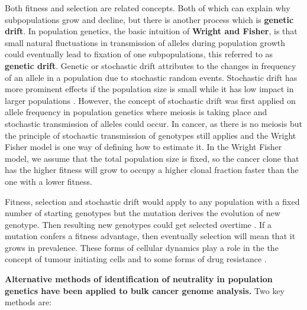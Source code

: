 Both fitness and selection are related concepts. Both of which can explain why subpopulations grow and decline, but there is another process which is \textbf{genetic drift}. In population genetics, the basic intuition of \textbf{Wright and Fisher}, is that small natural fluctuations in transmission of alleles during population growth could eventually lead to fixation of one subpopulations, this referred to as \textbf{genetic  drift}. Genetic or stochastic drift attributes to the changes in frequency of an allele in a population due to stochastic random events. Stochastic drift has more prominent effects if the population size is small while it has low impact in larger populations \cite{lynch2007origins}. However, the concept of stochastic drift was first applied on allele frequency in population genetics where meiosis is taking place and stochastic transmission of alleles could occur. In cancer, as there is no meiosis but the principle of stochastic transmission of genotypes still applies and the Wright Fisher model is one way of defining how to estimate it. In the Wright Fisher model, we assume that the total population size is fixed, so the cancer clone that has the higher fitness will grow to occupy a higher clonal fraction faster than the one with a lower fitness.


Fitness, selection and stochastic drift would apply to any population with a fixed number of starting genotypes but the mutation derives the evolution of new genotype. Then resulting new genotypes could get selected overtime \cite{jain2007deterministic,gerrish1998fate}. If a mutation confers a fitness advantage, then eventually selection will mean that it grows in prevalence.
These forms of cellular dynamics play a role in the the concept of tumour initiating cells \cite{magee2012cancer} and to some forms of drug resistance \cite{shaffer2017rare, kreso2013variable}. 



\textbf{Alternative methods of identification of neutrality in population genetics have been applied to bulk cancer genome analysis.} 
Two key methods are:

